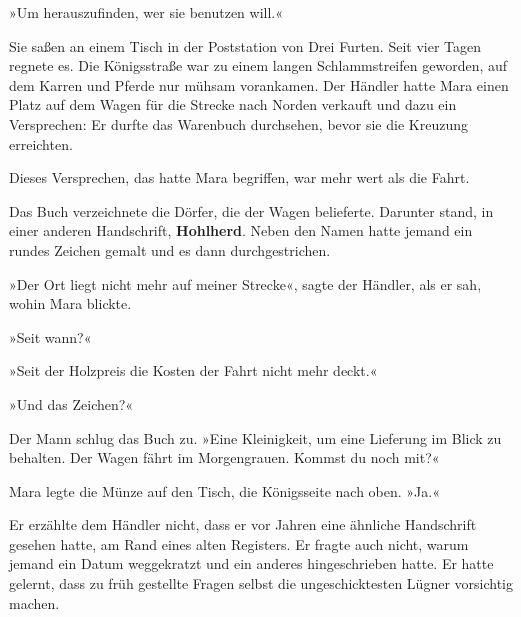\documentclass[10pt,a4paper]{article}
\begin{document}
»Um herauszufinden, wer sie benutzen will.«

Sie saßen an einem Tisch in der Poststation von Drei Furten. Seit vier Tagen regnete es. Die Königsstraße war zu einem langen Schlammstreifen geworden, auf dem Karren und Pferde nur mühsam vorankamen. Der Händler hatte Mara einen Platz auf dem Wagen für die Strecke nach Norden verkauft und dazu ein Versprechen: Er durfte das Warenbuch durchsehen, bevor sie die Kreuzung erreichten.

Dieses Versprechen, das hatte Mara begriffen, war mehr wert als die Fahrt.

Das Buch verzeichnete die Dörfer, die der Wagen belieferte. Darunter stand, in einer anderen Handschrift, \textbf{Hohlherd}. Neben den Namen hatte jemand ein rundes Zeichen gemalt und es dann durchgestrichen.

»Der Ort liegt nicht mehr auf meiner Strecke«, sagte der Händler, als er sah, wohin Mara blickte.

»Seit wann?«

»Seit der Holzpreis die Kosten der Fahrt nicht mehr deckt.«

»Und das Zeichen?«

Der Mann schlug das Buch zu. »Eine Kleinigkeit, um eine Lieferung im Blick zu behalten. Der Wagen fährt im Morgengrauen. Kommst du noch mit?«

Mara legte die Münze auf den Tisch, die Königsseite nach oben. »Ja.«

Er erzählte dem Händler nicht, dass er vor Jahren eine ähnliche Handschrift gesehen hatte, am Rand eines alten Registers. Er fragte auch nicht, warum jemand ein Datum weggekratzt und ein anderes hingeschrieben hatte. Er hatte gelernt, dass zu früh gestellte Fragen selbst die ungeschicktesten Lügner vorsichtig machen.
\end{document}
